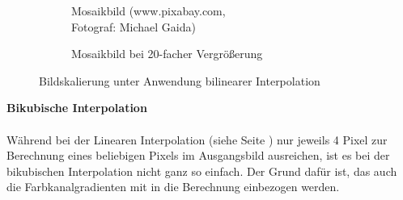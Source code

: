 \documentclass[
fontsize=10pt, 
listof = totoc,
parskip = half	
]{report}
\begin{document}
\begin{figure}[H]
	\begin{subfigure}[t]{0.49\textwidth}
		\centering
		\caption{Mosaikbild (www.pixabay.com,\\ Fotograf: Michael Gaida)}
	\end{subfigure}\hfill
	\begin{subfigure}[t]{0.49\textwidth}
		\centering
		\caption{Mosaikbild bei 20-facher Vergrößerung}
	\end{subfigure}
	\caption{Bildskalierung unter Anwendung bilinearer Interpolation}
	\label{fig:MosaicNearestNeighbor}
\end{figure}
\noindent\textbf{Bikubische Interpolation}
\\\\
Während bei der Linearen Interpolation (siehe Seite \pageref{par:LinearInterpol}) nur jeweils 4 Pixel zur Berechnung eines beliebigen Pixels im Ausgangsbild ausreichen, ist es bei der bikubischen Interpolation nicht ganz so einfach. Der Grund dafür ist, das  auch die Farbkanalgradienten mit in die Berechnung einbezogen werden. 
\end{document}
